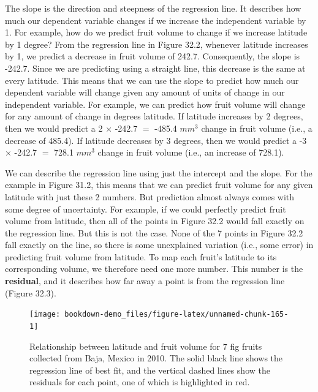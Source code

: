 \documentclass[
]{scrbook}
\begin{document}
The slope is the direction and steepness of the regression line.
It describes how much our dependent variable changes if we increase the independent variable by 1.
For example, how do we predict fruit volume to change if we increase latitude by 1 degree?
From the regression line in Figure 32.2, whenever latitude increases by 1, we predict a decrease in fruit volume of 242.7.
Consequently, the slope is -242.7.
Since we are predicting using a straight line, this decrease is the same at every latitude.
This means that we can use the slope to predict how much our dependent variable will change given any amount of units of change in our independent variable.
For example, we can predict how fruit volume will change for any amount of change in degrees latitude.
If latitude increases by 2 degrees, then we would predict a 2 \(\times\) -242.7 \(=\) -485.4 \(mm^{3}\) change in fruit volume (i.e., a decrease of 485.4).
If latitude decreases by 3 degrees, then we would predict a -3 \(\times\) -242.7 \(=\) 728.1 \(mm^{3}\) change in fruit volume (i.e., an increase of 728.1).

We can describe the regression line using just the intercept and the slope.
For the example in Figure 31.2, this means that we can predict fruit volume for any given latitude with just these 2 numbers.
But prediction almost always comes with some degree of uncertainty.
For example, if we could perfectly predict fruit volume from latitude, then all of the points in Figure 32.2 would fall exactly on the regression line.
But this is not the case.
None of the 7 points in Figure 32.2 fall exactly on the line, so there is some unexplained variation (i.e., some error) in predicting fruit volume from latitude.
To map each fruit's latitude to its corresponding volume, we therefore need one more number.
This number is the \textbf{residual}, and it describes how far away a point is from the regression line (Figure 32.3).

\begin{figure}
\texttt{[image: bookdown-demo\_files/figure-latex/unnamed-chunk-165-1]} \caption{Relationship between latitude and fruit volume for 7 fig fruits collected from Baja, Mexico in 2010. The solid black line shows the regression line of best fit, and the vertical dashed lines show the residuals for each point, one of which is highlighted in red.}\label{fig:unnamed-chunk-165}
\end{figure}
\end{document}
